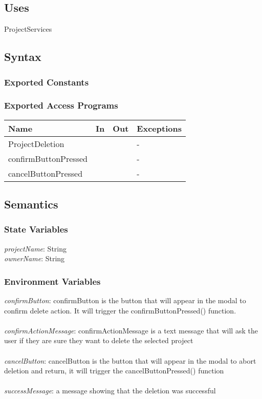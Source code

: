 \documentclass[12pt, titlepage]{article}
\begin{document}
	\subsection{Uses}
	ProjectServices
	
	\subsection{Syntax}
	
	\subsubsection{Exported Constants}
	
	\subsubsection{Exported Access Programs}
	
	\begin{center}
		\begin{tabular}{p{2cm} p{4cm} p{4cm} p{2cm}}
			\hline
			\textbf{Name} & \textbf{In} & \textbf{Out} & \textbf{Exceptions} \\
			\hline
			ProjectDeletion & & & - \\
			\hline
			confirmButtonPressed & & & - \\
			\hline
			cancelButtonPressed & & & - \\
			\hline
		\end{tabular}
	\end{center}
	
	\subsection{Semantics}
	
	\subsubsection{State Variables}
	\textit{projectName}: String \\
	\textit{ownerName}: String
	
	\subsubsection{Environment Variables}
	
	\textit{confirmButton}: confirmButton is the button that will appear in the modal to confirm delete action. It will trigger the confirmButtonPressed() function. \\\\ 
	\textit{confirmActionMessage}: confirmActionMessage is a text message that will ask the user if they are sure they want to delete the selected project \\\\
	\textit{cancelButton}: cancelButton is the button that will appear in the modal to abort deletion and return, it will trigger the cancelButtonPressed() function \\\\ 
	\textit{successMessage}: a message showing that the deletion was successful
	
\end{document}
